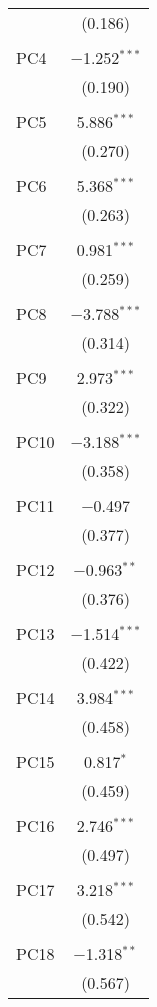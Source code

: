 \begin{table}[!htbp]
\begin{tabular}{@{\extracolsep{5pt}}lc}
  & (0.186) \\ 
  & \\ 
 PC4 & $-$1.252$^{***}$ \\ 
  & (0.190) \\ 
  & \\ 
 PC5 & 5.886$^{***}$ \\ 
  & (0.270) \\ 
  & \\ 
 PC6 & 5.368$^{***}$ \\ 
  & (0.263) \\ 
  & \\ 
 PC7 & 0.981$^{***}$ \\ 
  & (0.259) \\ 
  & \\ 
 PC8 & $-$3.788$^{***}$ \\ 
  & (0.314) \\ 
  & \\ 
 PC9 & 2.973$^{***}$ \\ 
  & (0.322) \\ 
  & \\ 
 PC10 & $-$3.188$^{***}$ \\ 
  & (0.358) \\ 
  & \\ 
 PC11 & $-$0.497 \\ 
  & (0.377) \\ 
  & \\ 
 PC12 & $-$0.963$^{**}$ \\ 
  & (0.376) \\ 
  & \\ 
 PC13 & $-$1.514$^{***}$ \\ 
  & (0.422) \\ 
  & \\ 
 PC14 & 3.984$^{***}$ \\ 
  & (0.458) \\ 
  & \\ 
 PC15 & 0.817$^{*}$ \\ 
  & (0.459) \\ 
  & \\ 
 PC16 & 2.746$^{***}$ \\ 
  & (0.497) \\ 
  & \\ 
 PC17 & 3.218$^{***}$ \\ 
  & (0.542) \\ 
  & \\ 
 PC18 & $-$1.318$^{**}$ \\ 
  & (0.567) \\ 

\end{tabular}
\end{table}
